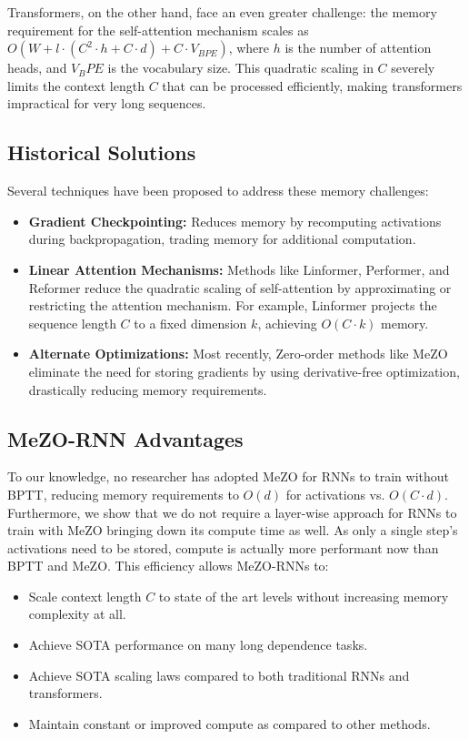 \documentclass{article}
\begin{document}
Transformers, on the other hand, face an even greater challenge: the memory requirement for the self-attention mechanism scales as $O(W + l \cdot (C^2 \cdot h + C \cdot d) + C \cdot V_{BPE})$, where $h$ is the number of attention heads, and $V_BPE$ is the vocabulary size. This quadratic scaling in $C$ severely limits the context length $C$ that can be processed efficiently, making transformers impractical for very long sequences.

\subsection{Historical Solutions}
Several techniques have been proposed to address these memory challenges:
\begin{itemize}
    \item \textbf{Gradient Checkpointing:} Reduces memory by recomputing activations during backpropagation, trading memory for additional computation.
    \item \textbf{Linear Attention Mechanisms:} Methods like Linformer, Performer, and Reformer reduce the quadratic scaling of self-attention by approximating or restricting the attention mechanism. For example, Linformer projects the sequence length $C$ to a fixed dimension $k$, achieving $O(C \cdot k)$ memory.
    \item \textbf{Alternate Optimizations:} Most recently, Zero-order methods like MeZO eliminate the need for storing gradients by using derivative-free optimization, drastically reducing memory requirements.
\end{itemize}

\subsection{MeZO-RNN Advantages}
To our knowledge, no researcher has adopted MeZO for RNNs to train without BPTT, reducing memory requirements to $O(d)$ for activations vs. $O(C \cdot d)$. Furthermore, we show that we do not require a layer-wise approach for RNNs to train with MeZO bringing down its compute time as well. As only a single step's activations need to be stored, compute is actually more performant now than BPTT and MeZO. This efficiency allows MeZO-RNNs to:
\begin{itemize}
    \item Scale context length $C$ to state of the art levels without increasing memory complexity at all.
    \item Achieve SOTA performance on many long dependence tasks.
    \item Achieve SOTA scaling laws compared to both traditional RNNs and transformers. 
    \item Maintain constant or improved compute as compared to other methods.
\end{itemize}
\end{document}
